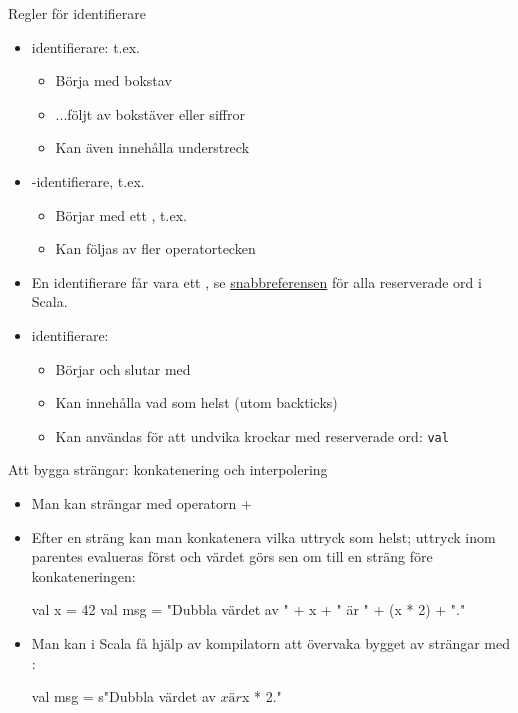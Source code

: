 \begin{Slide}{Regler för identifierare}
\begin{itemize}
\item {} identifierare: t.ex. 
\begin{itemize}
\item Börja med bokstav
\item ...följt av bokstäver eller siffror
\item Kan även innehålla understreck
\end{itemize}

\item {}-identifierare, t.ex. \code{+:}
\begin{itemize}
\item Börjar med ett , t.ex. 
\item Kan följas av fler operatortecken
\end{itemize}


\item En identifierare får  vara ett , se \href{http://cs.lth.se/pgk/quickref}{snabbreferensen} för alla reserverade ord i Scala.

\item {} identifierare: 
\begin{itemize}
\item Börjar och slutar med   
\item Kan innehålla vad som helst (utom backticks)
\item Kan användas för att undvika krockar med reserverade ord: \texttt{val}
\end{itemize}

\end{itemize}
\end{Slide}


\begin{Slide}{Att bygga strängar: konkatenering och interpolering}
\begin{itemize}
\item Man kan  strängar med operatorn + \\ 
\item Efter en sträng kan man konkatenera vilka uttryck som helst; uttryck inom parentes evalueras först och värdet görs sen om till en sträng före konkateneringen:
\begin{Code}
val x = 42
val msg = "Dubbla värdet av " + x + " är " + (x * 2) + "."
\end{Code}
\item Man kan i Scala få hjälp av kompilatorn att övervaka bygget av strängar med  :
\begin{Code}
val msg = s"Dubbla värdet av $x är ${x * 2}."
\end{Code}

\end{itemize}
\end{Slide}

